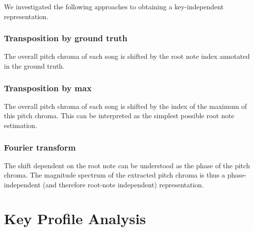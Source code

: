 \documentclass{article}
\begin{document}

We investigated the following approaches to obtaining a key-independent representation.

\subsubsection{Transposition by ground truth}
The overall pitch chroma of each song is shifted by the root note index annotated in the ground truth.

\subsubsection{Transposition by max}
The overall pitch chroma of each song is shifted by the index of the maximum of this pitch chroma. This can be interpreted as the simplest possible root note estimation.

\subsubsection{Fourier transform}
The shift dependent on the root note can be understood as the phase of the pitch chroma. The magnitude spectrum of the extracted pitch chroma is thus a phase-independent (and therefore root-note independent) representation.

\section{Key Profile Analysis}
\end{document}
